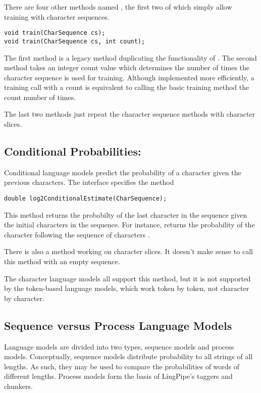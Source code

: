 There are four other methods named , the first two
of which simply allow training with character sequences.
%
\begin{verbatim}
void train(CharSequence cs);
void train(CharSequence cs, int count);
\end{verbatim}
%
The first method is a legacy method duplicating the functionality of
.  The second method takes an integer count value which
determines the number of times the character sequence is used for
training.  Although implemented more efficiently, a training call
with a count is equivalent to calling the basic training method the
count number of times.

The last two methods just repeat the character sequence methods
with character slices.


\subsection{Conditional Probabilities: }

Conditional language models predict the probability of a character
given the previous characters.  The interface
 specifies the method
%
\begin{verbatim}
double log2ConditionalEstimate(CharSequence);
\end{verbatim}
%
This method returns the probabilty of the last character in the
sequence given the initial characters in the sequence.  For instance,
 returns the probability of the
character  following the sequence of characters
.  

There is also a method working on character slices.  It doesn't make
sense to call this method with an empty sequence.

The character language models all support this method, but it is not
supported by the token-based language models, which work token by
token, not character by character.

\subsection{Sequence versus Process Language Models}

Language models are divided into two types, sequence models and
process models.  Conceptually, sequence models distribute probability
to all strings of all lengths.  As such, they may be used to compare
the probabilities of words of different lengths.  Process models
form the basis of LingPipe's taggers and chunkers.

